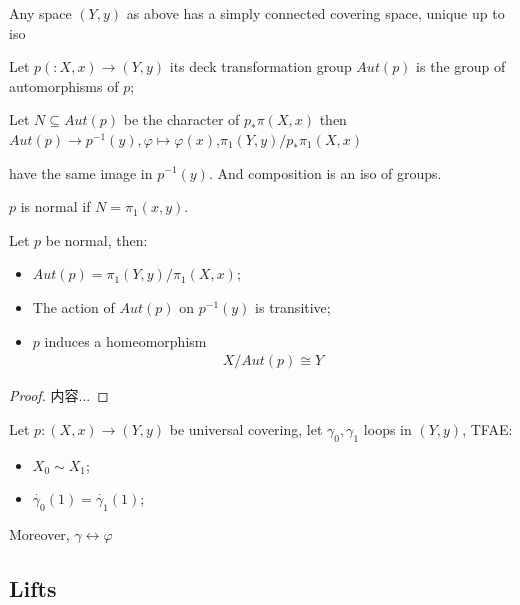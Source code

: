 \documentclass[Total.tex]{subfiles}
\begin{document}
\begin{proposition}
		\begin{corollary}
			Any space $(Y,y)$ as above has a simply connected covering space, unique up to iso
		\end{corollary}
		
		\begin{Def}
			Let $p(:X,x)\rightarrow (Y,y)$ its deck transformation group $Aut(p)$ is the group of automorphisms of $p$;
		\end{Def}
		
		\begin{proposition}
			Let $N\subseteq Aut(p)$ be the character of $p_*\pi(X,x)$ then $Aut(p)\rightarrow p^{-1}(y),\varphi\mapsto \varphi(x)$,$\pi_1(Y,y)/p_*\pi_1(X,x)$
		\end{proposition}
		have the same image in $p^{-1}(y)$. And composition is an iso of groups.
	\end{proposition}
	\begin{Def}
		$p$ is normal if $N=\pi_1(x,y)$.
	\end{Def}
	
	\begin{corollary}
		Let $p$ be normal, then:
		\begin{itemize}
			\item $Aut(p)=\pi_1(Y,y)/\pi_1(X,x)$;
			\item The action of $Aut(p)$ on $p^{-1}(y)$ is transitive;
			\item $p$ induces a homeomorphism
			\begin{gather*}
				X/Aut(p)\cong Y
			\end{gather*}
		\end{itemize}
	\end{corollary}
	\begin{proof}
		内容...
	\end{proof}
	
	\begin{corollary}
		Let $p:(X,x)\rightarrow (Y,y)$ be universal covering, let $\gamma_0,\gamma_1$ loops in $(Y,y)$, TFAE:
		\begin{itemize}
			\item $X_0\sim X_1$;
			\item $\dot{\gamma_0}(1)=\dot{\gamma_1}(1)$;
		\end{itemize}
		Moreover, $\gamma\leftrightarrow \varphi$
	\end{corollary}
	\subsection{Lifts}
\end{document}
